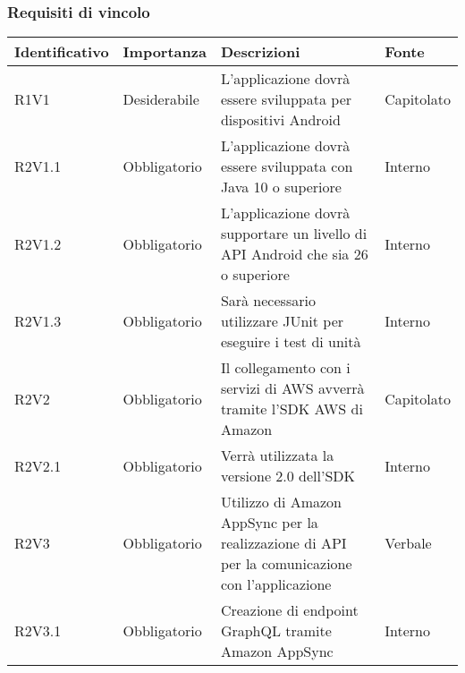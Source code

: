 \subsubsection{Requisiti di vincolo}
\begin{center}
	\renewcommand{\arraystretch}{1.5}
	\begin{longtable}{  >{\RaggedRight}p{2.5cm}  
						>{\RaggedRight}p{2.1cm} 
						>{\RaggedRight}p{7cm}  
						>{\RaggedRight}p{1.7cm} 
						}
		\rowcolor{tableHeadYellow}

		\textbf{Identificativo}   & \textbf{Importanza} & \textbf{Descrizioni} & \textbf{Fonte} \\ 
		\endhead

		R1V1   & Desiderabile & L'applicazione dovrà essere sviluppata per dispositivi Android                                                                             & Capitolato            \\  
		R2V1.1 & Obbligatorio & L'applicazione dovrà essere sviluppata con Java 10 o superiore                                                                             & Interno               \\  
		R2V1.2 & Obbligatorio & L'applicazione dovrà supportare un livello di API Android che sia 26 o superiore                                                           & Interno               \\  
		R2V1.3 & Obbligatorio & Sarà necessario utilizzare JUnit per eseguire i test di unità                                                                              & Interno               \\  
		R2V2   & Obbligatorio & Il collegamento con i servizi di AWS avverrà tramite l'SDK AWS  di Amazon                                                                  & Capitolato            \\  
		R2V2.1 & Obbligatorio & Verrà utilizzata la versione 2.0 dell'SDK                                                                                                  & Interno               \\  
		R2V3   & Obbligatorio & Utilizzo di Amazon AppSync per la realizzazione di API per la comunicazione con l'applicazione                                         & Verbale               \\  
		R2V3.1 & Obbligatorio & Creazione di endpoint GraphQL tramite Amazon AppSync                                                                               & Interno               \\  

\end{longtable}
\end{center}
